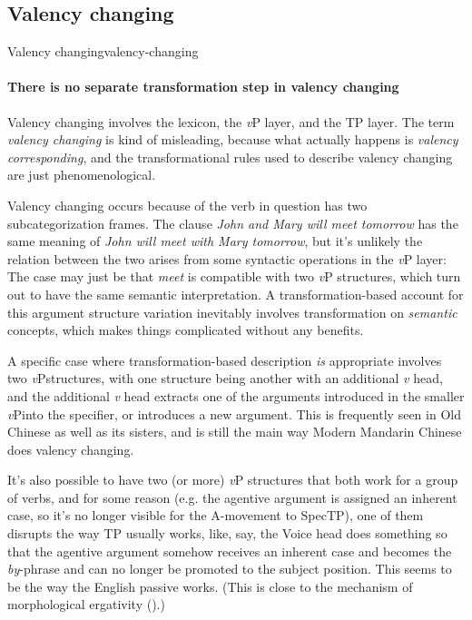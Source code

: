 \documentclass[UTF8, a4paper, oneside, scheme=plain]{ctexrep}
\newcommand*{\term}[1]{\emph{#1}}
\newcommand{\corpus}[1]{\emph{#1}}
\newcommand{\vP}{\textit{v}P}
\begin{document}
\subsection{Valency changing}\label{sec:overview.valency-changing}

\begin{theorybox}{Valency changing}{valency-changing}
    \paragraph*{There is no separate transformation step in valency changing} 
    Valency changing involves the lexicon, the \vP{} layer, and the TP layer.
    The term \term{valency changing} is kind of misleading,
    because what actually happens is \emph{valency corresponding},
    and the transformational rules used to describe valency changing 
    are just phenomenological.

    Valency changing occurs because of 
    the verb in question has two subcategorization frames.
    The clause \corpus{John and Mary will meet tomorrow} 
    has the same meaning of \corpus{John will meet with Mary tomorrow},
    but it's unlikely the relation between the two arises from some syntactic operations in the \vP{} layer:
    The case may just be that \corpus{meet} is compatible with two \vP{} structures,
    which turn out to have the same semantic interpretation.
    A transformation-based account for this argument structure variation 
    inevitably involves transformation on \emph{semantic} concepts,
    which makes things complicated without any benefits.

    A specific case where transformation-based description \emph{is} appropriate 
    involves two \vP structures, 
    with one structure being 
    another with an additional \term{v} head,
    and the additional \term{v} head 
    extracts one of the arguments introduced in the smaller \vP into the specifier,
    or introduces a new argument.
    This is frequently seen in Old Chinese as well as its sisters,
    and is still the main way Modern Mandarin Chinese does valency changing.

    It's also possible to have two (or more) \vP{} structures that both work for a group of verbs,
    and for some reason (e.g. the agentive argument is assigned an inherent case, 
    so it's no longer visible for the A-movement to SpecTP),
    one of them disrupts the way TP usually works,
    like, say, the Voice head does something 
    so that the agentive argument somehow receives an inherent case 
    and becomes the \corpus{by}-phrase and can no longer be promoted to the subject position.
    This seems to be the way the English passive works.
    (This is close to the mechanism of morphological ergativity ().)


\end{theorybox}
\end{document}
